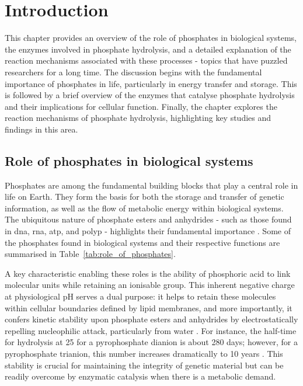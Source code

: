 \chapter{Introduction}
This chapter provides an overview of the role of phosphates in biological systems, the enzymes involved in phosphate hydrolysis, and a detailed explanation of the reaction mechanisms associated with these processes - topics that have puzzled researchers for a long time. The discussion begins with the fundamental importance of phosphates in life, particularly in energy transfer and storage. This is followed by a brief overview of the enzymes that catalyse phosphate hydrolysis and their implications for cellular function. Finally, the chapter explores the reaction mechanisms of phosphate hydrolysis, highlighting key studies and findings in this area.

\section{Role of phosphates in biological systems}
Phosphates are among the fundamental building blocks that play a central role in life on Earth. They form the basis for both the storage and transfer of genetic information, as well as the flow of metabolic energy within biological systems. The ubiquitous nature of phosphate esters and anhydrides - such as those found in \ac{dna}, \ac{rna}, \ac{atp}, and \ac{polyp} - highlights their fundamental importance \citep{westheimerWhyNatureChose1987}. Some of the phosphates found in biological systems and their respective functions are summarised in Table~\ref{tab:role_of_phosphates}.

A key characteristic enabling these roles is the ability of phosphoric acid to link molecular units while retaining an ionisable group. This inherent negative charge at physiological pH serves a dual purpose: it helps to retain these molecules within cellular boundaries defined by lipid membranes, and more importantly, it confers kinetic stability upon phosphate esters and anhydrides by electrostatically repelling nucleophilic attack, particularly from water \citep{westheimerWhyNatureChose1987}. For instance, the half-time for hydrolysis at 25 for a pyrophosphate dianion is about 280 days; however, for a pyrophosphate trianion, this number increases dramatically to 10 years \citep{wolfendenDegreesDifficultyWaterConsuming2006}. This stability is crucial for maintaining the integrity of genetic material but can be readily overcome by enzymatic catalysis when there is a metabolic demand.


